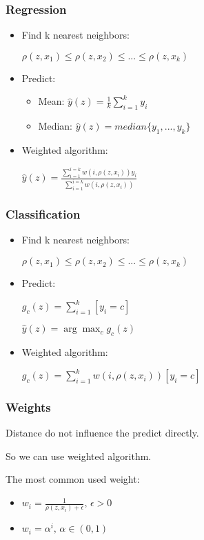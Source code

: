 \documentclass{beamer}
\begin{document}
		\begin{frame}
			\frametitle{Regression}
			
			\begin{itemize}
				\item Find k nearest neighbors:
					\begin{center}
					$\rho(z, x_1) \le \rho(z, x_2) \le ... \le \rho(z, x_k)$
					\end{center}				
				\item Predict:
					\begin{itemize}
						\item Mean: $\hat{y}(z) = \frac{1}{k}\sum_{i=1}^{k} y_i$
						\item Median: $\hat{y}(z) = median \{y_1, ..., y_k\}$
					\end{itemize}
				\item Weighted algorithm:
					\begin{center}
					$\hat{y}(z) = \frac{\sum_{i=1}^{i=k}w(i, \rho(z, x_i))y_i}{\sum_{i=1}^{i=k}w(i, \rho(z, x_i))}$
					\end{center}
			\end{itemize}
			
		\end{frame}
	
		\begin{frame}
			\frametitle{Classification}
			
			\begin{itemize}
				\item Find k nearest neighbors:
				\begin{center}
				$\rho(z, x_1) \le \rho(z, x_2) \le ... \le \rho(z, x_k)$
				\end{center}
				\item Predict:
				\begin{center}
				$g_c(z) = \sum_{i=1}^{k} [y_i = c]$
				\end{center}
				\begin{center}
				$\hat{y}(z) = \arg\! \max_c g_c(z)$
				\end{center}
				\item Weighted algorithm:
				\begin{center}
				$g_c(z) = \sum_{i=1}^{k} w(i, \rho(z, x_i))[y_i = c]$
				\end{center}
			\end{itemize}
			
		\end{frame}
	
		\begin{frame}
			\frametitle{Weights}
			
			Distance do not influence the predict directly. 
			
			So we can use weighted algorithm.
			
			The most common used weight: 
			\begin{itemize}
				\item 	$w_i = \frac{1}{\rho(z, x_i) + \epsilon}, \, \epsilon > 0$
				\item 	$w_i = \alpha^i, \, \alpha \in (0, 1)$
			\end{itemize}
		
			
		\end{frame}
	
\end{document}
